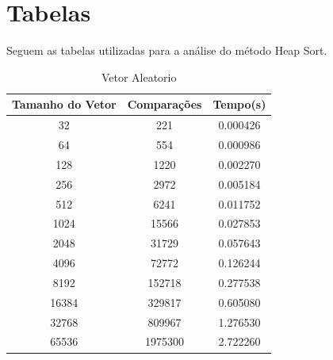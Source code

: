 \documentclass[12pt,a4paper,twoside]{report}
\begin{document}
\chapter{Tabelas}

Seguem as tabelas utilizadas para a análise do método Heap Sort.

\begin{table}[h]
  \centering
  \caption{Vetor Aleatorio \label{tab:aleatorio}}
  \begin{tabular}{ccc} \\\hline
  \textbf{Tamanho do Vetor} & \textbf{Comparações} & \textbf{Tempo(s)} \\\hline
  32                        & 221                 & 0.000426          \\\hline
  64                        & 554                 & 0.000986          \\\hline
  128                       & 1220                & 0.002270         \\\hline
  256                       &  2972               & 0.005184          \\\hline
  512                       &  6241                & 0.011752         \\\hline
  1024                      & 15566               & 0.027853         \\\hline
  2048                      &  31729              & 0.057643          \\\hline
  4096                      & 72772              & 0.126244         \\\hline
  8192                      & 152718             & 0.277538         \\\hline
  16384                     & 329817            & 0.605080       \\\hline
  32768                     & 809967            & 1.276530        \\\hline
  65536                     & 1975300            & 2.722260       \\\hline
  \end{tabular}
\end{table}
\end{document}
